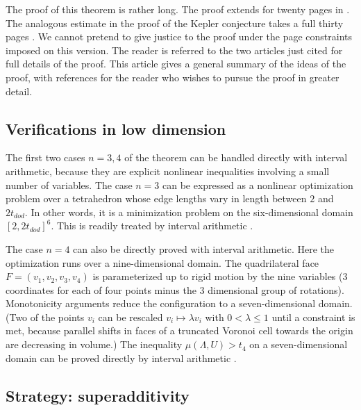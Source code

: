 \documentclass{article} %
\begin{document}
The proof of this theorem is rather long. The proof extends for
twenty pages in \cite[pp.19-38]{Hales:2002:Dodec}. The analogous
estimate in the proof of the Kepler conjecture takes a full thirty
pages \cite[pp.126-156]{Hales:2006:DCG}. We cannot pretend to give
justice to the proof under the page constraints imposed on this
version. The reader is referred to the two articles just cited for
full details of the proof. This article gives a general summary of the
ideas of the proof, with references for the reader who wishes to
pursue the proof in greater detail.

\subsection{Verifications in low dimension}

The first two cases $n=3,4$ of the theorem can be handled directly
with interval arithmetic, because they are explicit nonlinear
inequalities involving a small number of variables. The case $n=3$ can
be expressed as a nonlinear optimization problem over a tetrahedron
whose edge lengths vary in length between $2$ and $2t_{dod}$. In other
words, it is a minimization problem on the six-dimensional domain
$[2,2t_{dod}]^6$. This is readily treated by interval arithmetic
\cite{McLaughlin:2008:KeplerCode}.

The case $n=4$ can also be directly proved with interval arithmetic.
Here the optimization runs over a nine-dimensional domain. The
quadrilateral face $F=(v_1,v_2,v_3,v_4)$ is parameterized up to rigid
motion by the nine variables (3 coordinates for each of four points
minus the 3 dimensional group of rotations). Monotonicity arguments
reduce the configuration to a seven-dimensional domain. (Two of the
points $v_i$ can be rescaled $v_i \mapsto \lambda v_i$ with $0 <
\lambda \le 1$ until a constraint is met, because parallel shifts in
faces of a truncated Voronoi cell towards the origin are decreasing in
volume.) The inequality $\mu(\Lambda,U)> t_4$ on a seven-dimensional
domain can be proved directly by interval arithmetic
\cite{McLaughlin:2008:KeplerCode}.

\subsection{Strategy: superadditivity}

\end{document}
